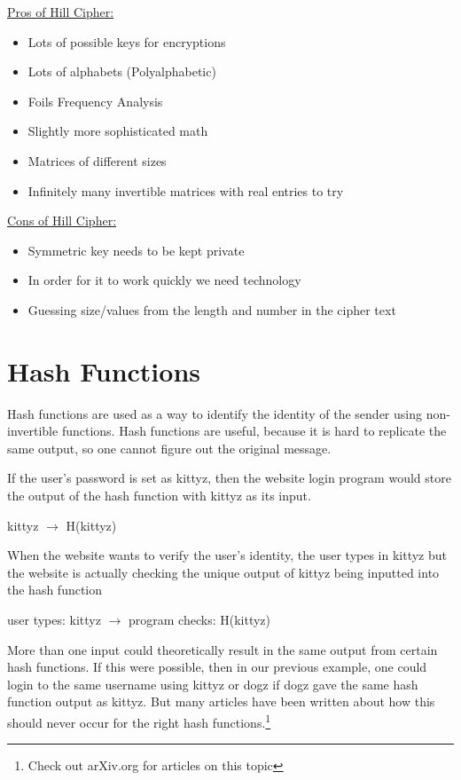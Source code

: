\underline{Pros of Hill Cipher:}
\begin{itemize}
\item Lots of possible keys for encryptions
\item Lots of alphabets (Polyalphabetic)
\item Foils Frequency Analysis
\item Slightly more sophisticated math
\item Matrices of different sizes
\item Infinitely many invertible matrices with real entries to try
\end{itemize}

\underline{Cons of Hill Cipher:}
\begin{itemize}
\item Symmetric key needs to be kept private
\item In order for it to work quickly we need technology
\item Guessing size/values from the length and number in the cipher text
\end{itemize}

\section{Hash Functions}
Hash functions are used as a way to identify the identity of the sender using non-invertible functions.  Hash functions are useful, because it is hard to replicate the same output, so one cannot figure out the original message.

\begin{example} 
If the user's password is set as kittyz, then the website login program would store the output of the hash function with kittyz as its input.
\begin{center} kittyz $\rightarrow$ H(kittyz)\end{center}  When the website wants to verify the user's identity, the user types in kittyz but the website is actually checking the unique output of kittyz being inputted into the hash function\\
\begin{center} user types: kittyz $\rightarrow$ program checks: H(kittyz) \end{center}
\end{example}

\vspace{5mm}
More than one input could theoretically result in the same output from certain hash functions. If this were possible, then in our previous example, one could login to the same username using kittyz or dogz if dogz gave the same hash function output as kittyz.  But many articles have been written about how this should never occur for the right hash functions.\footnote{Check out arXiv.org for articles on this topic}

